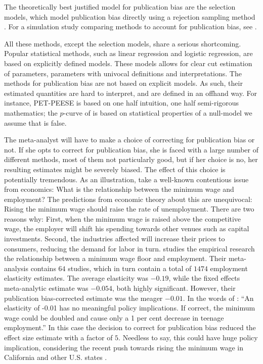 The theoretically best justified model for publication bias are the selection models, which model publication bias directly using a rejection sampling method \textcite{Hedges1992-ue}. For a simulation study comparing methods to account for publication bias, see \textcite{moreno_assessment_2009,Carter2019-rw}.

All these methods, except the selection models, share a serious shortcoming. Popular statistical methods, such as linear regression and logistic regression, are based on explicitly defined models. These models allows for clear cut estimation of parameters, parameters with univocal definitions and interpretations. The methods for publication bias are not based on explicit models. As such, their estimated quantities are hard to interpret, and are defined in an offhand way. For instance, PET-PEESE is based on one half intuition, one half semi-rigorous mathematics; the $p$-curve of is based on statistical properties of a null-model we assume that is false. 

The meta-analyst will have to make a choice of correcting for publication bias or not. If she opts to correct for publication bias, she is faced with a large number of different methods, most of them not particularly good, but if her choice is no, her resulting estimates might be severely biased. The effect of this choice is potentially tremendous. As an illustration, take a well-known contentious issue from economics: What is the relationship between the minimum wage and employment? The predictions from economic theory about this are unequivocal: Rising the minimum wage should raise the rate of unemployment. There are two reasons why: First, when the minimum wage is raised above the competitive wage, the employer will shift his spending towards other venues such as capital investments. Second, the industries affected will increase their prices to consumers, reducing the demand for labor in turn. \textcite{doucouliagos_publication_2009} studies the empirical research the relationship between a minimum wage floor and employment. Their meta-analysis contains $64$ studies, which in turn contain a total of $1474$ employment elasticity estimates. The average elasticity was $-0.19$, while the fixed effects meta-analytic estimate was $-0.054$, both highly significant. However, their publication bias-corrected estimate was the meager $-0.01$. In the words of \textcite{doucouliagos_publication_2009}: ``An elasticity of -0.01 has no meaningful policy implications. If correct, the minimum wage could be doubled and cause only a 1 per cent decrease in teenage employment.'' In this case the decision to correct for publication bias reduced the effect size estimate with a factor of $5$. Needless to say, this could have huge policy implication, considering the recent push towards rising the minimum wage in California and other U.S. states \parencite{Lee2016-bd}.

